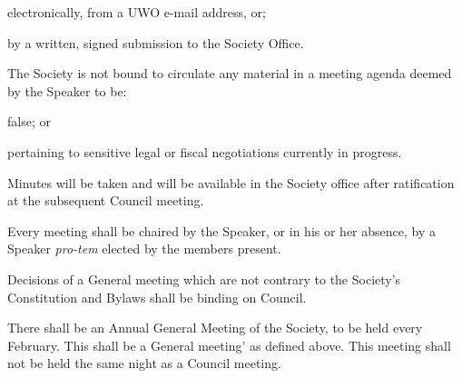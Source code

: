 \begin{longenum}[ label*=\thesubsection.\arabic*., align=left]
    \begin{longenum}[ label*=\arabic*., align=left]
		\item electronically, from a UWO e-mail address, or;
        \item by a written, signed submission to the Society Office.
	\end{longenum}
    \item The Society is not bound to circulate any material in a meeting agenda deemed by the Speaker to be:
    \begin{longenum}[ label*=\arabic*., align=left]
		\item false; or
        \item pertaining to sensitive legal or fiscal negotiations currently in progress.
	\end{longenum}
    \item Minutes will be taken and will be available in the Society office after ratification at the subsequent Council meeting.

    \item Every meeting shall be chaired by the Speaker, or in his or her absence, by a Speaker  \textit{pro-tem} elected by the members present.
    \item Decisions of a General meeting which are not contrary to the Society's Constitution and Bylaws shall be binding on Council.
    \item There shall be an Annual General Meeting of the Society, to be held every February. This shall be a General  meeting' as defined above. This meeting  shall not be held the same night as a Council meeting. 
\end{longenum}
